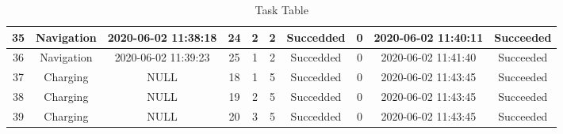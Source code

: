 \begin{table}[]
{\begin{tabular}{|c|c|c|c|c|c|c|c|c|c|}
35 & Navigation & 2020-06-02 11:38:18 & 24 & 2 & 2 & Succedded & 0 & 2020-06-02 11:40:11 & Succeeded \\ \hline
36 & Navigation & 2020-06-02 11:39:23 & 25 & 1 & 2 & Succedded & 0 & 2020-06-02 11:41:40 & Succeeded \\ \hline
37 & Charging & NULL & 18 & 1 & 5 & Succedded & 0 & 2020-06-02 11:43:45 & Succeeded \\ \hline
38 & Charging & NULL & 19 & 2 & 5 & Succedded & 0 & 2020-06-02 11:43:45 & Succeeded \\ \hline
39 & Charging & NULL & 20 & 3 & 5 & Succedded & 0 & 2020-06-02 11:43:45 & Succeeded \\ \hline
\end{tabular}}
\caption{Task Table}
\label{tab:exp_task_table}
\end{table}




